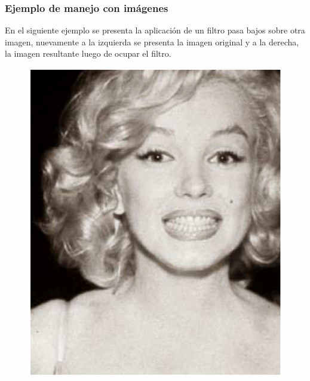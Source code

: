 \begin{frame}
\frametitle{Ejemplo de manejo con imágenes}
En el siguiente ejemplo se presenta la aplicación de un filtro pasa bajos sobre otra imagen, \pause  nuevamente a la izquierda se presenta la imagen original y a la derecha, \pause la imagen resultante luego de ocupar el filtro.
\end{frame}
\begin{frame}[plain]
\begin{figure}
    \centering
    \includegraphics[scale=0.25]{Imagenes/Marylin_01.eps}

\end{figure}
\end{frame}

